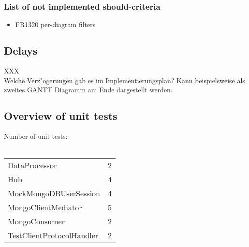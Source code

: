 \documentclass[oneside, english, final]{design}
\begin{document}
\subsubsection{List of not implemented should-criteria}
\begin{itemize}
\item{FR1320 per-diagram filters}
\end{itemize}


\subsection{Delays}
XXX
\\
Welche Verz"ogerungen gab es im Implementierungsplan? Kann beispielsweise als zweites
GANTT Diagramm am Ende dargestellt werden.
\subsection{Overview of unit tests}
Number of unit tests:\\
\hfill
\\
\begin{tabular}{l r}
DataProcessor & 2\\
Hub & 4\\
MockMongoDBUserSession & 4\\
MongoClientMediator & 5 \\
MongoConsumer & 2 \\
TestClientProtocolHandler & 2\\
\end{tabular}
\end{document}
